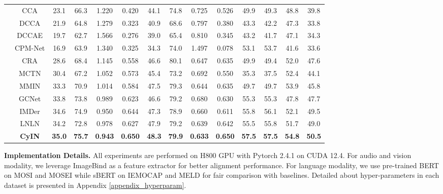 \documentclass{article}
\begin{document}
\begin{table}[htbp]
{\begin{tabular}{cccccccccccccc}
    \midrule[0.5pt]
     ~ & CCA & 23.1  & 66.3  & 1.220  & 0.420  & 44.1  & 74.8  & 0.725  & 0.526  & 49.9  & 49.3  & 48.8  & 39.8   \\ 
        ~ & DCCA & 21.9  & 64.8  & 1.279  & 0.323  & 40.9  & 68.6  & 0.797  & 0.380  & 43.3  & 42.2  & 47.3  & 33.8   \\ 
        ~ & DCCAE & 19.7  & 62.7  & 1.566  & 0.276  & 39.0  & 65.4  & 0.810  & 0.345  & 43.2  & 41.7  & 47.1  & 34.3   \\ 
        ~ & CPM-Net & 16.9  & 63.9  & 1.340  & 0.325  & 34.3  & 74.0  & 1.497  & 0.078  & 53.1  & 53.7  & 41.6  & 33.6   \\ 
        ~ & CRA & 28.6  & 68.4  & 1.145  & 0.558  & 46.6  & 80.1  & 0.647  & 0.635  & 49.9  & 49.4  & 52.0  & 47.6   \\ 
        ~ & MCTN & 30.4  & 67.2  & 1.052  & 0.573  & 45.4  & 73.2  & 0.692  & 0.550  & 35.3  & 37.5  & 52.4  & 44.1   \\ 
        ~ & MMIN & 33.3  & 70.9  & 1.014  & 0.584  & 47.5  & 79.3  & 0.644  & 0.635  & 49.7  & 49.7  & 53.9  & 45.8  \\ 
        ~ & GCNet & 33.8  & 73.8  & 0.989  & 0.623  & 46.6  & 79.2  & 0.680  & 0.630  & 55.3  & 55.3  & 47.8  & 47.7   \\ 
        ~ & IMDer & 34.6  & 74.9  & 0.950  & 0.644  & 47.3  & 78.9  & 0.660  & 0.611  & 55.8  & 56.1  & 52.1  & 49.5  \\ 
        ~ & LNLN & 34.2  & 72.8  & 0.978  & 0.627  & 47.9  & 79.2  & 0.639  & 0.642  & 55.5  & 55.8  & 51.7  & 49.0  \\ 
    ~ & \textbf{CyIN}  & \textbf{35.0} & \textbf{75.7} & \textbf{0.943} & \textbf{0.650} & \textbf{48.3} & \textbf{79.9} & \textbf{0.633} & \textbf{0.650} & \textbf{57.5} & \textbf{57.5} & \textbf{54.8} & \textbf{50.5} \\ 
    \bottomrule[1.5pt]
\end{tabular}
}
\end{table}

\textbf{Implementation Details.}
All experiments are performed on H800 GPU with Pytorch 2.4.1 on CUDA 12.4. For audio and vision modality, we leverage ImageBind \cite{girdhar2023imagebind} as a feature extractor for better alignment performance. For language modality, we use pre-trained BERT \cite{devlin2019bert} on MOSI and MOSEI while sBERT \cite{reimers2019sbert} on IEMOCAP and MELD for fair comparison with baselines. Detailed about hyper-parameters in each dataset is presented in Appendix \ref{appendix_hyperparam}.
\end{document}
